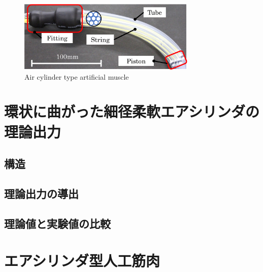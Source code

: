 \begin{figure}[t]
  \centering
  \includegraphics[width=85mm]{_pdf/紹介-エアシリンダ型人工筋肉.pdf}
  \caption{Air cylinder type artificial muscle}
  \label{artificial muscle}
\end{figure}

\section{環状に曲がった細径柔軟エアシリンダの理論出力}%
\subsection{構造}%

\subsection{理論出力の導出}%

\subsection{理論値と実験値の比較}%


\section{エアシリンダ型人工筋肉}
